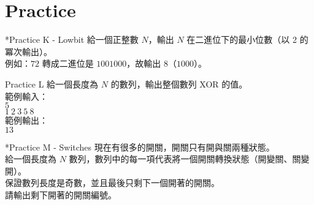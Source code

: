 \documentclass[t]{beamer}
\begin{document}
\section{Practice}
\begin{frame}{*Practice K - Lowbit}
  給一個正整數 $N$，輸出 $N$ 在二進位下的最小位數（以 2 的冪次輸出）。\\
  例如：$72$ 轉成二進位是 $1001000$，故輸出 $8$（$1000$）。
\end{frame}

\begin{frame}{Practice L}
  給一個長度為 $N$ 的數列，輸出整個數列 XOR 的值。\\
  範例輸入：\\
  $5$\\
  $1\ 2\ 3\ 5\ 8$\\
  範例輸出：\\
  $13$
\end{frame}

\begin{frame}{*Practice M - Switches}
  現在有很多的開關，開關只有開與關兩種狀態。\\
  給一個長度為 $N$ 數列，數列中的每一項代表將一個開關轉換狀態（開變關、關變開）。\\
  保證數列長度是奇數，並且最後只剩下一個開著的開關。\\
  請輸出剩下開著的開關編號。
\end{frame}
\end{document}
